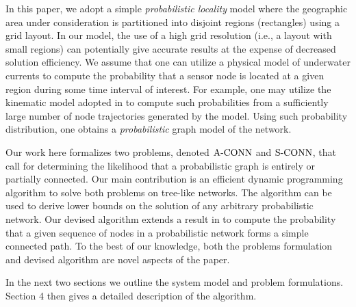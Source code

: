 In this paper, we adopt a simple {\em probabilistic locality} model
where the geographic area under consideration is partitioned into
disjoint regions (rectangles) using a grid layout.
%
In our model, the use of a high grid resolution (i.e., a layout with small
regions) can potentially give accurate results at the expense of decreased
solution efficiency.
%
We assume that one can utilize a physical model of underwater currents to
compute the probability that a sensor node is located at a given region
during some time interval of interest.
%
For example, one may utilize the kinematic model adopted in
\cite{caruso2008meandering} to compute such probabilities from a
sufficiently large number of node trajectories generated by the model.
%
Using such probability distribution, one obtains a {\em probabilistic} graph
model of the network.

Our work here formalizes two problems, denoted ${\mathrm {A\mbox{-}CONN}}$ and ${\mathrm {S\mbox{-}CONN}}$,
that call for determining the likelihood that a probabilistic graph
is entirely or partially connected.
%
Our main contribution is an efficient dynamic programming algorithm to
solve both problems on tree-like networks.
%
The algorithm can be used to derive lower bounds on the solution of
any arbitrary probabilistic network.
%
Our devised algorithm extends a result in \cite{elmallah01supporting}
to compute the probability that a given sequence of nodes 
in a probabilistic network forms a simple connected path.
%
To the best of our knowledge, both the problems formulation and devised
algorithm are novel aspects of the paper.  

In the next two sections we outline the system model and problem formulations.
Section 4 then gives a detailed description of the algorithm.

